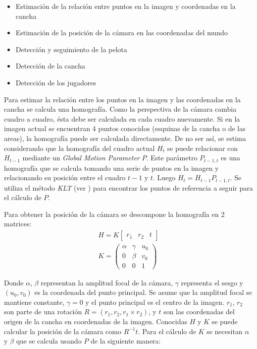 \begin{itemize}
  \item Estimación de la relación entre puntos en la imagen y coordenadas en la cancha
  \item Estimación de la posición de la cámara en las coordenadas del mundo
  \item Detección y seguimiento de la pelota
  \item Detección de la cancha
  \item Detección de los jugadores
\end{itemize}

Para estimar la relación entre los puntos en la imagen y las coordenadas en la cancha se calcula una homografía.
Como la perspectiva de la cámara cambia cuadro a cuadro, ésta debe ser calculada en cada cuadro nuevamente.
Si en la imagen actual se encuentran 4 puntos conocidos (esquinas de la cancha o de las areas), la homografía puede ser calculada directamente.
De no ser así, se estima considerando que la homografía del cuadro actual $H_t$ se puede
relacionar con $H_{t-1}$ mediante un \textit{Global Motion Parameter} $P$.
Este parámetro $P_{t-1,t}$ es una homografía que se calcula tomando una serie de puntos en la imagen y relacionando su posición entre el cuadro $t-1$ y $t$.
Luego $ H_t = H_{t-1} P_{t-1,t}$. Se utiliza el método \textit{KLT} (ver \cite{KLT}) para encontrar los puntos de referencia a seguir para el cálculo de $P$.

Para obtener la posición de la cámara se descompone la homografía en 2 matrices:
\begin{eqnarray*}
H = K \begin{bmatrix} r_1 & r_2 & t \end{bmatrix} \\
K = \begin{pmatrix}
    \alpha & \gamma & u_0 \\
    0 & \beta & v_0 \\
    0 & 0 & 1
    \end{pmatrix}
\end{eqnarray*}

Donde $\alpha$, $\beta$ representan la amplitud focal de la cámara, $\gamma$ representa el sesgo y $(u_0, v_0)$ es la coordenada del punto principal.
Se asume que la amplitud focal se mantiene constante, $\gamma = 0$ y el punto principal es el centro de la imagen.
$r_1$, $r_2$ son parte de una rotación $R = (r_1, r_2, r_1 \times r_2)$, y $t$ son las coordenadas del origen de la cancha en coordenadas de la imagen.
Conocidas $H$ y $K$ se puede calcular la posición de la cámara como $R^{-1} t$.
Para el cálculo de $K$ se necesitan $\alpha$ y $\beta$ que se calcula usando $P$ de la siguiente manera:

